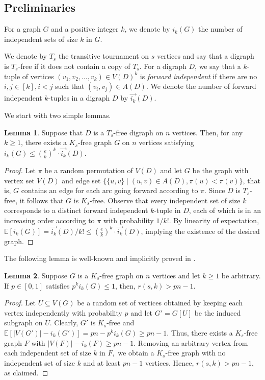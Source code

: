 \documentclass{article}
\theoremstyle{plain}
\newtheorem{lemma}[theorem]{Lemma}
\theoremstyle{definition}
\newtheorem{lemma}{Lemma}
\DeclareMathOperator{\E}{\mathbb{E}}
\renewcommand{\E}{\mathbb{E}}
\newcommand{\fwi}[1]{\overrightarrow{i_{#1}}}
\begin{document}
\subsection{Preliminaries} \label{subsec:prelims}
For a graph $G$ and a positive integer $k$, we denote by $i_k(G)$ the number of independent sets of size $k$ in $G$. 

We denote by $T_s$ the transitive tournament on $s$ vertices and say that a digraph is $T_s$-free if it does not contain a copy of $T_s$. For a digraph $D$, we say that a $k$-tuple of vertices $(v_1, v_2, \dots, v_k) \in V(D)^k$ is \emph{forward independent} if there are no $i, j \in [k], i < j$ such that $(v_i, v_j) \in A(D)$. We denote the number of forward independent $k$-tuples in a digraph $D$ by $\fwi{k}(D)$.

We start with two simple lemmas.
\begin{lemma} \label{lem:Ts-free-Ks-free}
    Suppose that $D$ is a $T_s$-free digraph on $n$ vertices. Then, for any $k \ge 1$, there exists a $K_s$-free graph $G$ on $n$ vertices satisfying $i_k(G) \le \left(\frac{e}{k} \right)^k \cdot \fwi{k}(D)$.
\end{lemma}
\begin{proof}
    Let $\pi$ be a random permutation of $V(D)$ and let $G$ be the graph with vertex set $V(D)$ and edge set $\{ \{u, v\} \mid (u, v) \in A(D), \pi(u) < \pi(v) \}$, that is, $G$ contains an edge for each arc going forward according to $\pi$. Since $D$ is $T_s$-free, it follows that $G$ is $K_s$-free. Observe that every independent set of size $k$ corresponds to a distinct forward independent $k$-tuple in $D$, each of which is in an increasing order according to $\pi$ with probability $1/k!$. By linearity of expectation, $\E[i_k(G)] = \fwi{k}(D) / k! \le \left( \frac{e}{k}\right)^k \cdot \fwi{k}(D)$, implying the existence of the desired graph.
\end{proof}

The following lemma is well-known and implicitly proved in \cite{mubayi-verstraete}.
\begin{lemma} \label{lem:sampling-Ks-free}
    Suppose $G$ is a $K_s$-free graph on $n$ vertices and let $k \ge 1$ be arbitrary. If $p \in [0, 1]$ satisfies $p^{k} i_k(G) \le 1$, then, $r(s, k) > pn - 1.$
\end{lemma}
\begin{proof}
    Let $U \subseteq V(G)$ be a random set of vertices obtained by keeping each vertex independently with probability $p$ and let $G' = G[U]$ be the induced subgraph on $U$. Clearly, $G'$ is $K_s$-free and $\E[ |V(G')| - i_k(G')] = p n - p^k i_k(G) \ge pn - 1$. Thus, there exists a $K_s$-free graph $F$ with $|V(F)| - i_k(F) \ge pn - 1$. Removing an arbitrary vertex from each independent set of size $k$ in $F,$ we obtain a $K_s$-free graph with no independent set of size $k$ and at least $pn - 1$ vertices. Hence, $r(s, k) > pn - 1$, as claimed.
\end{proof}
\end{document}
